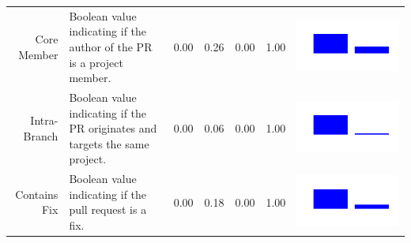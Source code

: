 \begin{table}[ht]
\begin{tabular}{rp{26em}rrrrc}
    Core Member & Boolean value indicating if the author of the PR is a project member. & 0.00 & 0.26 & 0.00 & 1.00 & \includegraphics[scale = 0.1, clip = true, trim= 50px 60px 50px 60px]{../figs/hist-features/hist-coreMember.pdf} \\
    Intra-Branch & Boolean value indicating if the PR originates and targets the same project. & 0.00 & 0.06 & 0.00 & 1.00 & \includegraphics[scale = 0.1, clip = true, trim= 50px 60px 50px 60px]{../figs/hist-features/hist-intraBranch.pdf} \\
    Contains Fix & Boolean value indicating if the pull request is a fix. & 0.00 & 0.18 & 0.00 & 1.00 & \includegraphics[scale = 0.1, clip = true, trim= 50px 60px 50px 60px]{../figs/hist-features/hist-containsFix.pdf} \\

\end{tabular}
\end{table}
